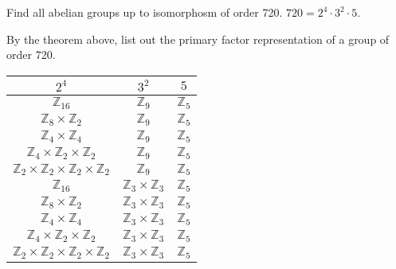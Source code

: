 \begin{eg}
    Find all abelian groups up to isomorphosm of order 720. $720 = 2^4 \cdot 3^2 \cdot 5$.\\
\end{eg}
\begin{answer}
    By the theorem above, list out the primary factor representation of a group of order 720.\\
    \begin{tabular}{|c|c|c|}
        \hline
        $2^4$ & $3^2$ & $5$ \\ \hline
        $\mathbb{Z}_{16}$ & $\mathbb{Z}_9$ & $\mathbb{Z}_5$ \\ \hline
        $\mathbb{Z}_{8} \times \mathbb{Z}_2$ & $\mathbb{Z}_9$ & $\mathbb{Z}_5$ \\ \hline
        $\mathbb{Z}_{4} \times \mathbb{Z}_4$ & $\mathbb{Z}_9$ & $\mathbb{Z}_5$ \\ \hline
        $\mathbb{Z}_{4} \times \mathbb{Z}_2 \times \mathbb{Z}_2$ & $\mathbb{Z}_9$ & $\mathbb{Z}_5$ \\ \hline
        $\mathbb{Z}_{2} \times \mathbb{Z}_2 \times \mathbb{Z}_2 \times \mathbb{Z}_2$ & $\mathbb{Z}_9$ & $\mathbb{Z}_5$ \\ \hline
        $\mathbb{Z}_{16}$ & $\mathbb{Z}_3 \times \mathbb{Z}_3$ & $\mathbb{Z}_5$ \\ \hline
        $\mathbb{Z}_{8} \times \mathbb{Z}_2$ & $\mathbb{Z}_3 \times \mathbb{Z}_3$ & $\mathbb{Z}_5$ \\ \hline
        $\mathbb{Z}_{4} \times \mathbb{Z}_4$ & $\mathbb{Z}_3 \times \mathbb{Z}_3$ & $\mathbb{Z}_5$ \\ \hline
        $\mathbb{Z}_{4} \times \mathbb{Z}_2 \times \mathbb{Z}_2$ & $\mathbb{Z}_3 \times \mathbb{Z}_3$ & $\mathbb{Z}_5$ \\ \hline
        $\mathbb{Z}_{2} \times \mathbb{Z}_2 \times \mathbb{Z}_2 \times \mathbb{Z}_2$ & $\mathbb{Z}_3 \times \mathbb{Z}_3$ & $\mathbb{Z}_5$ \\ \hline
    \end{tabular}
\end{answer}

